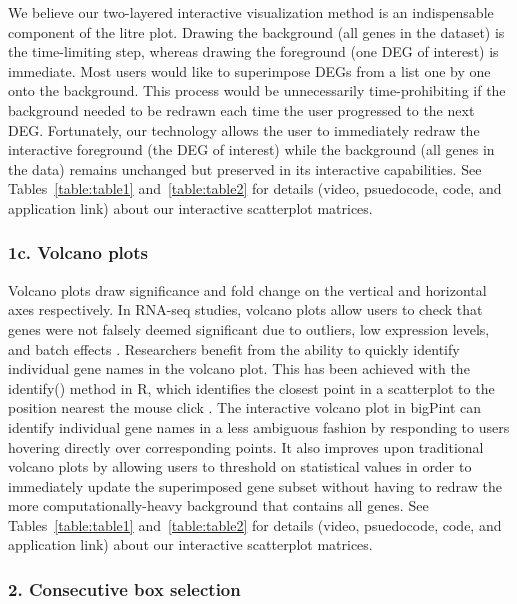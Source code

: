 \documentclass[parskip=full]{bmcart}
\begin{document}
We believe our two-layered interactive visualization method is an indispensable component of the litre plot. Drawing the background (all genes in the dataset) is the time-limiting step, whereas drawing the foreground (one DEG of interest) is immediate. Most users would like to superimpose DEGs from a list one by one onto the background. This process would be unnecessarily time-prohibiting if the background needed to be redrawn each time the user progressed to the next DEG. Fortunately, our technology allows the user to immediately redraw the interactive foreground (the DEG of interest) while the background (all genes in the data) remains unchanged but preserved in its interactive capabilities. See Tables~\ref{table:table1} and~\ref{table:table2} for details (video, psuedocode, code, and application link) about our interactive scatterplot matrices.

\subsubsection*{1c. Volcano plots}

Volcano plots draw significance and fold change on the vertical and horizontal axes respectively. In RNA-seq studies, volcano plots allow users to check that genes were not falsely deemed significant due to outliers, low expression levels, and batch effects \cite{li2011application}. Researchers benefit from the ability to quickly identify individual gene names in the volcano plot. This has been achieved with the identify() method in R, which identifies the closest point in a scatterplot to the position nearest the mouse click \cite{li2011application}. The interactive volcano plot in bigPint can identify individual gene names in a less ambiguous fashion by responding to users hovering directly over corresponding points. It also improves upon traditional volcano plots by allowing users to threshold on statistical values in order to immediately update the superimposed gene subset without having to redraw the more computationally-heavy background that contains all genes. See Tables~\ref{table:table1} and~\ref{table:table2} for details (video, psuedocode, code, and application link) about our interactive scatterplot matrices.

\subsubsection*{2. Consecutive box selection}
\end{document}
